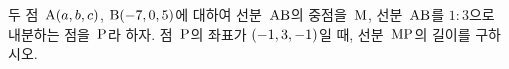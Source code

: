 두 점~$\mathrm{A}(a{,}\mkern3mu\mathopen{}b{,}\mkern3mu\mathopen{}c)$, $\mathrm{B}(-7{,}\mkern3mu\mathopen{}0{,}\mkern3mu\mathopen{}5)$에 대하여 선분~$\mathrm{AB}$의 중점을~$\mathrm{M}$, 선분~$\mathrm{AB}$를 $1:3$으로 내분하는 점을~$\mathrm{P}$라 하자. 점~$\mathrm{P}$의 좌표가 $(-1{,}\mkern3mu\mathopen{}3{,}\mkern3mu\mathopen{}-1)$일 때, 선분~$\mathrm{MP}$의 길이를 구하시오.
